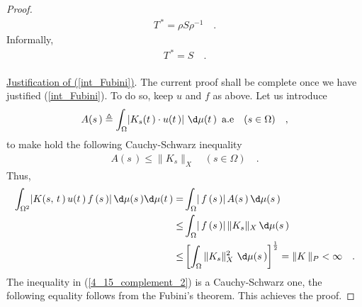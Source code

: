 \begin{proof}
\begin{align}
 T^{\,\ast}   =  \rho S \rho^{\minus 1} \quad .
\end{align}
Informally, 
\begin{align}
T^{\,\ast} = S\quad .
\end{align}
\\
\underline{Justification of (\ref{int_Fubini})}. The current proof shall be complete once we have justified (\ref{int_Fubini}). To do so, keep $u$ and $f$ as above. Let us introduce
\begin{align}
A(s\,)\Def \int_\Omega \lvert K_s(t\,) \cdot u (t\,)\rvert  \,\, \d\mu(t\,) \, \,\,\text{a.e}  \quad (s\in \Omega)\quad ,
\end{align}
to make hold the following Cauchy-Schwarz inequality
\begin{align}
A(s\,)\leq \| K_s\|_X  \quad (s\in \Omega)\quad .
\end{align}
Thus,
\begin{align}
 \int_{\Omega^2} \lvert K(s,\,t\,) \, u(t\,)\,  f\,(s\,) \rvert \,\d\mu(s\,)\d\mu(t\,) 
 = &   \int_\Omega   \lvert \,f\,(s\,) \rvert \,A(s\,) \, \d\mu(s\,) \\
 \leq &  \int_\Omega   \lvert \,f\,(s\,) \rvert  \, \| K_s\|_X\,\d\mu(s\,) \\
 \label{4_15_complement_2} \leq & \left[ \int_\Omega \| K_s\|_X^2\,\,\d\mu(s\,) \right]^{\frac{1}{2}} 
 =      \| K\,\|_P < \infty \quad .
 \end{align}
The inequality in (\ref{4_15_complement_2}) is a Cauchy-Schwarz one, the following equality follows from the Fubini's theorem. This achieves the proof.\end{proof}








